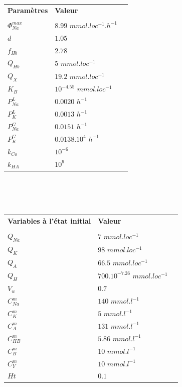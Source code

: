 \documentclass[a4paper,fleqn]{article}
\begin{document}
\begin{tabular}{p{5cm}lr}
\textbf{Paramètres}                                                   & \textbf{Valeur} \\
\\
$\Phi^{max}_{Na}$ & $8.99$ $mmol.loc^{-1}.h^{-1}$    \\
$d$ & $1.05$   \\
$f_{Hb}$ & $2.78$    \\
$Q_{Hb}$ & $5$ $mmol.loc^{-1}$   \\
$Q_{X}$ & $19.2$ $mmol.loc^{-1}$     \\
$K_B$ & $10^{-4.55}$ $mmol.loc^{-1}$   \\
$P^L_{Na}$ & $0.0020$ $h^{-1}$   \\
$P^L_{K}$ & $0.0013$	 $h^{-1}$   \\
$P^G_{Na}$ & $0.0151$ $h^{-1}$   \\
$P^G_{K}$ & $0.0138 .10^4$ $h^{-1}$   \\
$k_{Co}$ & $10^{-6}$  \\
$k_{HA}$ & $10^{9}$  \\


\end{tabular}\\
\\
\\

\begin{tabular}{p{5cm}lr}
\textbf{Variables à l'état initial}                                                   & \textbf{Valeur} \\
\\
$Q_{Na}$ & $7$ $mmol.loc^{-1}$   \\
$Q_{K}$  & $98$ $mmol.loc^{-1}$     \\
$Q_{A}$ & $66.5$ $mmol.loc^{-1}$ \\
$Q_{H}$ & $700 . 10^{-7.26}$ $mmol.loc^{-1}$    \\
$V_w$ & $0.7$   \\
$C^m_{Na}$ & $140$ $mmol.l^{-1}$     \\
$C^m_K$  & $5$ $mmol.l^{-1}$   \\
$C^m_A$   & $131$ $mmol.l^{-1}$    \\
$C^m_{HB}$  & $5.86$ $mmol.l^{-1}$      \\
$C^m_{B}$  & $10$ $mmol.l^{-1}$      \\
$C^m_{Y}$  & $10$ $mmol.l^{-1}$     \\
$Ht$ & $0.1$   \\

\end{tabular}\\
\\
\end{document}
